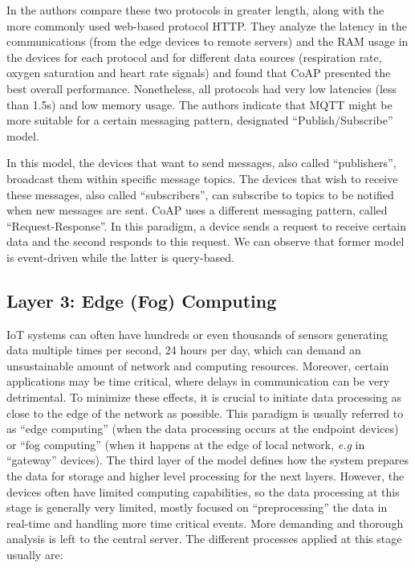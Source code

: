 In \cite{Rubi2019} the authors compare these two protocols in greater length, along with the more commonly used web-based protocol HTTP. They analyze the latency in the communications (from the edge devices to remote servers) and the RAM usage in the devices for each protocol and for different data sources (respiration rate, oxygen saturation and heart rate signals) and found that \acs{CoAP} presented the best overall performance. Nonetheless, all protocols had very low latencies (less than 1.5s) and low memory usage. The authors indicate that \acs{MQTT} might be more suitable for a certain messaging pattern, designated ``Publish/Subscribe'' model. \bigskip

In this model, the devices that want to send messages, also called ``publishers'', broadcast them within specific message topics. The devices that wish to receive these messages, also called ``subscribers'', can subscribe to topics to be notified when new messages are sent. \acs{CoAP} uses a different messaging pattern, called ``Request-Response''. In this paradigm, a device sends a request to receive certain data and the second responds to this request. We can observe that former model is event-driven while the latter is query-based. 

\subsection{Layer 3: Edge (Fog) Computing}
\label{sec:iot-model-layer3}

\acs{IoT} systems can often have hundreds or even thousands of sensors generating data multiple times per second, 24 hours per day, which can demand an unsustainable amount of network and computing resources. Moreover, certain applications may be time critical, where delays in communication can be very detrimental. To minimize these effects, it is crucial to initiate data processing as close to the edge of the network as possible. This paradigm is usually referred to as ``edge computing'' (when the data processing occurs at the endpoint devices) or ``fog computing'' (when it happens at the edge of local network, \textit{e.g} in ``gateway'' devices). The third layer of the model defines how the system prepares the data for storage and higher level processing for the next layers. However, the devices often have limited computing capabilities, so the data processing at this stage is generally very limited, mostly focused on ``preprocessing'' the data in real-time and handling more time critical events. More demanding and thorough analysis is left to the central server. The different processes applied at this stage usually are:

